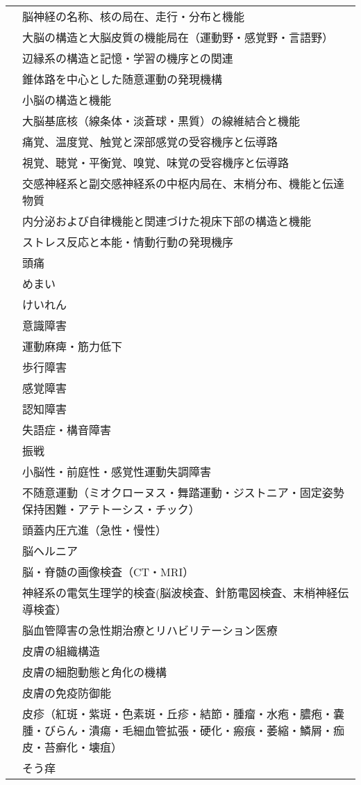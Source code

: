 \begin{xltabular}{\linewidth}{XX}
 & 脳神経の名称、核の局在、走行・分布と機能 \\
 & 大脳の構造と大脳皮質の機能局在（運動野・感覚野・言語野） \\
 & 辺縁系の構造と記憶・学習の機序との関連 \\
 & 錐体路を中心とした随意運動の発現機構 \\
 & 小脳の構造と機能 \\
 & 大脳基底核（線条体・淡蒼球・黒質）の線維結合と機能 \\
 & 痛覚、温度覚、触覚と深部感覚の受容機序と伝導路 \\
 & 視覚、聴覚・平衡覚、嗅覚、味覚の受容機序と伝導路 \\
 & 交感神経系と副交感神経系の中枢内局在、末梢分布、機能と伝達物質 \\
 & 内分泌および自律機能と関連づけた視床下部の構造と機能 \\
 & ストレス反応と本能・情動行動の発現機序 \\
 & 頭痛 \\
 & めまい \\
 & けいれん \\
 & 意識障害 \\
 & 運動麻痺・筋力低下 \\
 & 歩行障害 \\
 & 感覚障害 \\
 & 認知障害 \\
 & 失語症・構音障害 \\
 & 振戦 \\
 & 小脳性・前庭性・感覚性運動失調障害 \\
 & 不随意運動（ミオクローヌス・舞踏運動・ジストニア・固定姿勢保持困難・アテトーシス・チック） \\
 & 頭蓋内圧亢進（急性・慢性） \\
 & 脳ヘルニア \\
 & 脳・脊髄の画像検査（CT・MRI） \\
 & 神経系の電気生理学的検査(脳波検査、針筋電図検査、末梢神経伝導検査） \\
 & 脳血管障害の急性期治療とリハビリテーション医療 \\
 & 皮膚の組織構造 \\
 & 皮膚の細胞動態と角化の機構 \\
 & 皮膚の免疫防御能 \\
 & 皮疹（紅斑・紫斑・色素斑・丘疹・結節・腫瘤・水疱・膿疱・嚢腫・びらん・潰瘍・毛細血管拡張・硬化・瘢痕・萎縮・鱗屑・痂皮・苔癬化・壊疽） \\
 & そう痒 \\

\end{xltabular}
